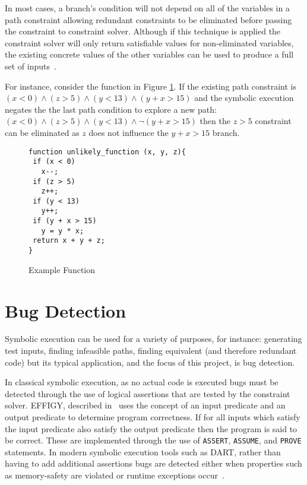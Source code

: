 \documentclass[]{final_report}
\begin{document}
In most cases, a branch's condition will not depend on all of the variables in a path constraint allowing redundant constraints to be eliminated before passing the constraint to constraint solver. Although if this technique is applied the constraint solver will only return satisfiable values for non-eliminated variables, the existing concrete values of the other variables can be used to produce a full set of inputs~\cite{cadar2013symbolic}.

For instance, consider the function in Figure \ref{fig:example-function}. If the existing path constraint is $(x < 0 ) \land ( z > 5) \land (y < 13) \land (y + x > 15)$ and the symbolic execution negates the the last path condition to explore a new path: $ (x < 0) \land (z > 5) \land (y < 13) \land \lnot(y + x > 15)$ then the $z > 5$ constraint can be eliminated as $z$ does not influence the $y + x > 15$ branch.

\begin{figure}[t]
\begin{verbatim}
function unlikely_function (x, y, z){
 if (x < 0)
   x--;
 if (z > 5)
   z++;
 if (y < 13)
   y++;
 if (y + x > 15)
   y = y * x;
 return x + y + z;
}
\end{verbatim}
\caption{\label{fig:example-function} Example Function}
\end{figure} 

\section{Bug Detection}

Symbolic execution can be used for a variety of purposes, for instance: generating test inputs, finding infeasible paths, finding equivalent (and therefore redundant code) but its typical application, and the focus of this project, is bug detection. 

In classical symbolic execution, as no actual code is executed bugs must be detected through the use of logical assertions that are tested by the constraint solver. EFFIGY, described in~\cite{king1976symbolic} uses the concept of an input predicate and an output predicate to determine program correctness. If for all inputs which satisfy the input predicate also satisfy the output predicate then the program is said to be correct. These are implemented through the use of \lstinline|ASSERT|, \lstinline|ASSUME|, and \lstinline|PROVE| statements. In modern symbolic execution tools such as DART, rather than having to add additional assertions bugs are detected either when properties such as memory-safety are violated or runtime exceptions occur~\cite{godefroid2005dart}.
\end{document}
